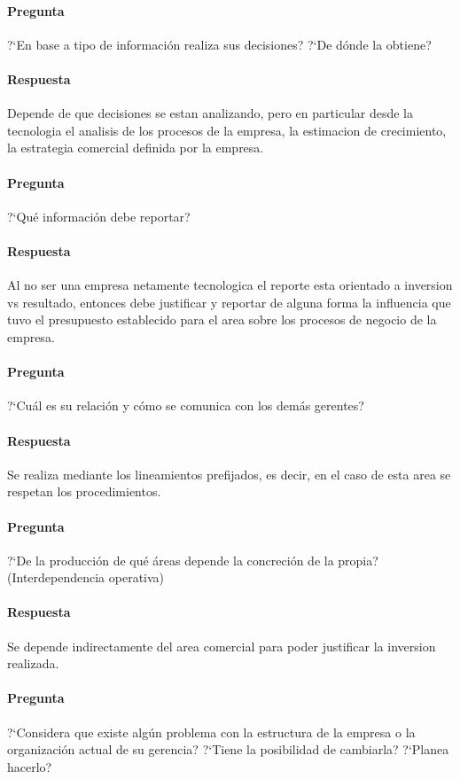 \documentclass[12pt,a4paper,spanish]{article}
\begin{document}
	\paragraph{Pregunta}
	 ?`En base a tipo de informaci\'on realiza sus decisiones?  ?`De d\'onde la obtiene?
	\paragraph{Respuesta}
	Depende de que decisiones se estan analizando, pero en particular desde la tecnologia el analisis de los procesos de la empresa, la estimacion de crecimiento, la estrategia comercial definida por la empresa.

	\paragraph{Pregunta}
	 ?`Qu\'e informaci\'on debe reportar?
	\paragraph{Respuesta}
Al no ser una empresa netamente tecnologica el reporte esta orientado a inversion vs resultado, entonces debe justificar y reportar de alguna forma la influencia que tuvo el presupuesto establecido para el area sobre los procesos de negocio de la empresa.

	\paragraph{Pregunta}
	 ?`Cu\'al es su relaci\'on y c\'omo se comunica con los dem\'as gerentes?
	\paragraph{Respuesta}
Se realiza mediante los lineamientos prefijados, es decir, en el caso de esta area se respetan los procedimientos.
	\paragraph{Pregunta}
	 ?`De la producci\'on de qu\'e \'areas depende la concreci\'on de la propia? (Interdependencia operativa)
	\paragraph{Respuesta}
Se depende indirectamente del area comercial para poder justificar la inversion realizada.

	\paragraph{Pregunta}
	 ?`Considera que existe alg\'un problema con la estructura de la empresa o la organizaci\'on actual de su gerencia?  ?`Tiene la posibilidad de cambiarla?  ?`Planea hacerlo?
\end{document}
